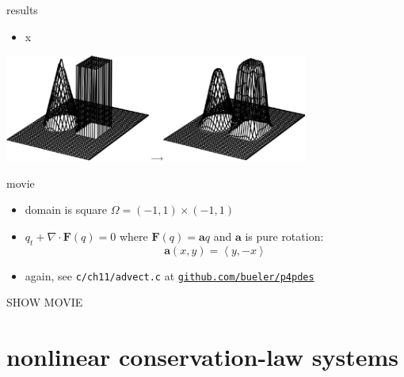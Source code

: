 \documentclass[10pt,hyperref]{beamer}
\newcommand{\ba}{\mathbf{a}}
\newcommand{\bF}{\mathbf{F}}
\newcommand{\Div}{\nabla\cdot}
\begin{document}
\begin{frame}{results}

\begin{itemize}
\item x
\end{itemize}

\hfill \includegraphics[width=0.75\textwidth]{figs/bueler11p7}
\end{frame}


\begin{frame}{movie}

\begin{itemize}
\item domain is square $\Omega = (-1,1) \times (-1,1)$
\item $q_t + \Div \bF(q) = 0$ where $\bF(q) = \ba q$ and $\ba$ is pure rotation:
    $$\ba(x,y) = \left<y,-x\right>$$
\item again, see \texttt{c/ch11/advect.c} at \href{https://github.com/bueler/p4pdes}{\texttt{github.com/bueler/p4pdes}}
\end{itemize}

\vspace{10mm}
\begin{center}
\alert{SHOW MOVIE}
\end{center}

\end{frame}


\section{nonlinear conservation-law systems}
\end{document}

